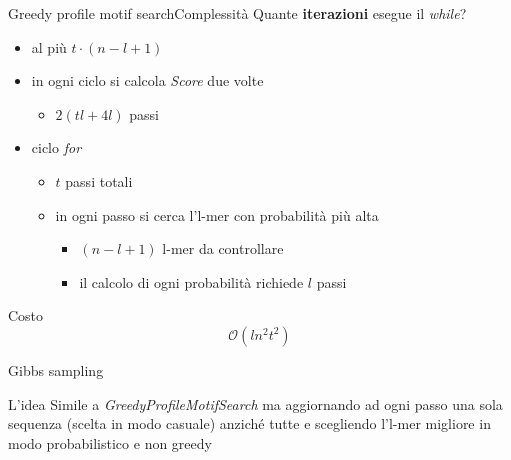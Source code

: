 	\begin{frame}{Greedy profile motif search}{Complessità}
		Quante \alert{\textbf{iterazioni}} esegue il \textit{while}?
		\pause
		\begin{itemize}
			\item al più $t\cdot(n-l+1)$
			\pause
			\item in ogni ciclo si calcola \textit{Score} due volte
			\begin{itemize}
				\item $2(tl+4l)$ passi
			\end{itemize}
			\pause
			\item ciclo \textit{for}
			\pause
			\begin{itemize}
				\item $t$ passi totali
				\item in ogni passo  si cerca l'l-mer con probabilità  più alta
				\pause
				\begin{itemize}
					\item $(n-l+1)$ l-mer da controllare
					\item il calcolo di ogni probabilità richiede $l$ passi
				\end{itemize}
				\pause
			\end{itemize}
		\end{itemize}
		\begin{center}
			\begin{minipage}{3cm}
				\begin{varblock}{Costo}
					$$\mathcal{O}(ln^2t^2)$$
				\end{varblock}
			\end{minipage}
		\end{center}
	\end{frame}
	
	\begin{frame}{Gibbs sampling}
		\begin{block}{L'idea}
			Simile a \textit{GreedyProfileMotifSearch} ma aggiornando ad ogni passo una sola sequenza (scelta in modo casuale) anziché tutte e scegliendo l'l-mer migliore in modo  probabilistico e non greedy
		\end{block}
	\end{frame}
	
